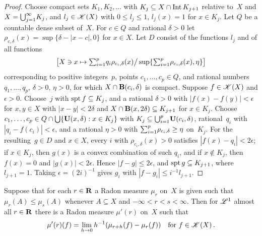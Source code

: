 \begin{proof}
    Choose compact sets $K_1, K_2, \ldots$ with $K_j \subseteq X \cap \operatorname{Int} K_{j+1}$ relative
    to~$X$ and $X = {{\textstyle \bigcup}}_{j=1}^\infty K_j$, and $l_j \in \mathscr{K}(X)$ with $0 \le l_j \le 1$,
    $l_j(x) = 1$ for $x \in K_j$. Let $Q$ be a countable dense subset of~$X$. For $c \in Q$ and
    rational $\delta > 0$ let $\rho_{c,\delta}(x) = \sup \{ \delta - |x - c|, 0 \}$ for $x \in
    X$. Let $D$ consist of the functions $l_j$ and of all functions
    \begin{displaymath}
        \big[ X \ni x \mapsto {\textstyle\sum_{i=1}^{p}} q_i \rho_{c_i,\delta}(x) \big/ \sup \{
        {\textstyle\sum_{i=1}^{p}} \rho_{c_i,\delta}(x), \eta \} \big]
    \end{displaymath}
    corresponding to positive integers~$p$, points $c_1, \ldots, c_p \in Q$, and rational numbers
    $q_1, \ldots, q_p$, $\delta > 0$, $\eta > 0$, for which $X \cap \mathbf{B}(c_i,\delta)$ is
    compact. Suppose $f \in \mathscr{K}(X)$ and $\epsilon > 0$. Choose~$j$ with $\operatorname{spt} f \subseteq
    K_j$, and a rational $\delta > 0$ with $|f(x) - f(y)| < \epsilon$ for $x, y \in X$ with $|x -
    y| < 2 \delta$ and $X \cap \mathbf{B}(x,2\delta) \subseteq K_{j+1}$ for $x \in K_j$. Choose $c_1,
    \ldots, c_p \in Q \cap {{\textstyle \bigcup}} \{ \mathbf{U}(x,\delta) : x \in K_j \}$ with $K_j \subseteq
    {{\textstyle \bigcup}}_{i=1}^p \mathbf{U}(c_i,\delta)$, rational~$q_i$ with $|q_i - f(c_i)| < \epsilon$, and a
    rational $\eta > 0$ with ${\textstyle\sum_{i=1}^{p}} \rho_{c_i,\delta} \ge \eta$ on~$K_j$. For the
    resulting~$g \in D$ and $x \in X$, every $i$ with $\rho_{c_i,\delta}(x) > 0$ satisfies $|f(x)
    - q_i| < 2 \epsilon$; if $x \in K_j$, then $g(x)$ is a convex combination of such $q_i$,
    and if $x \notin K_j$, then $f(x) = 0$ and $|g(x)| < 2 \epsilon$. Hence $|f - g| \le 2
    \epsilon$, and $\operatorname{spt} g \subseteq K_{j+1}$, where $l_{j+1} = 1$. Taking $\epsilon = (2i)^{-1}$
    gives $g_i$ with $|f - g_i| \le i^{-1} l_{j+1}$.
\end{proof}

\begin{lemma}
    \label{al:2.6(3)}
    Suppose that for each $r \in \mathbf{R}$ a Radon measure $\mu_r$ on~$X$ is given such that $\mu_r(A)
    \le \mu_s(A)$ whenever $A \subseteq X$ and $-\infty < r < s < \infty$. Then for $\mathscr{L}^1$
    almost all $r \in \mathbf{R}$ there is a Radon measure $\mu'(r)$ on~$X$ such that
    \begin{displaymath}
        \mu'(r)(f) = \lim_{h \to 0} h^{-1} (\mu_{r+h}(f) - \mu_r(f)) \quad \text{for $f \in
        \mathscr{K}(X)$} \,.
    \end{displaymath}
\end{lemma}

